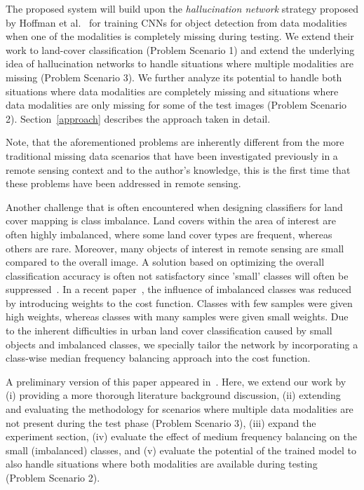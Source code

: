 \documentclass[journal]{IEEEtran}
\begin{document}
The proposed system will build upon the \emph{hallucination network} strategy proposed by Hoffman et al.~\cite{Hoffman_2016_CVPR} for training CNNs for object detection from data modalities when one of the modalities is completely missing during testing. We extend their work to land-cover classification (Problem Scenario 1) and extend the underlying idea of hallucination networks to handle situations where multiple modalities are missing (Problem Scenario 3). We further analyze its potential to handle both situations where data modalities are completely missing and situations where data modalities are only missing for some of the test images (Problem Scenario 2). Section~\ref{approach} describes the approach taken in detail. 

Note, that the aforementioned problems are inherently different from the more traditional missing data scenarios that have been investigated previously in a remote sensing context and to the author's knowledge, this is the first time that these problems have been addressed in remote sensing.

Another challenge that is often encountered when designing classifiers for land cover mapping is class imbalance. 
Land covers within the area of interest are often highly imbalanced, where some land cover types are frequent, whereas others are rare.
Moreover, many objects of interest in remote sensing are small compared to the overall image.
A solution based on optimizing the overall classification accuracy is often not satisfactory since 'small' classes will often be suppressed~\cite{estabrooks2004multiple}. In a recent paper~\cite{kampffmeyer2016semantic}, the influence of imbalanced classes was reduced by introducing weights to the cost function. Classes with few samples were given high weights, whereas classes with many samples were given small weights. 
Due to the inherent difficulties in urban land cover classification caused by small objects and imbalanced classes, we specially tailor the network by incorporating a class-wise median frequency balancing approach into the cost function.

A preliminary version of this paper appeared in~\cite{kampffmeyer2017igarss}. Here, we extend our work by 
(i) providing a more thorough literature background discussion,
(ii) extending and evaluating the methodology for scenarios where multiple data modalities are not present during the test phase (Problem Scenario 3),
(iii) expand the experiment section,
(iv) evaluate the effect of medium frequency balancing on the small (imbalanced) classes, and
(v) evaluate the potential of the trained model to also handle situations where both modalities are available during testing (Problem Scenario 2).
\end{document}
